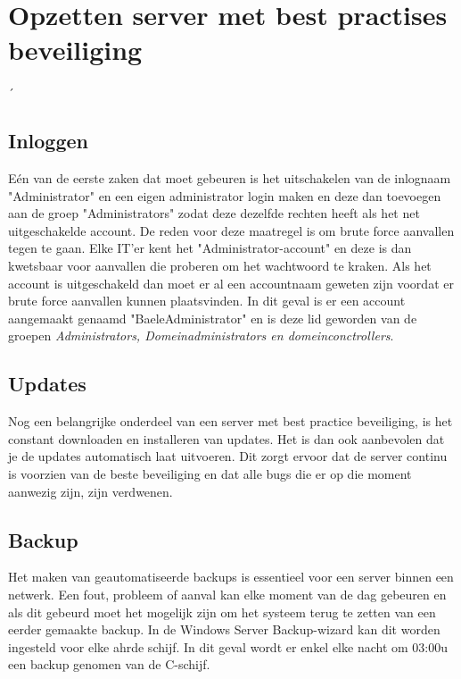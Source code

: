 \documentclass[pdftex,a4paper,12pt]{report}
\begin{document}
\subsection{}
\chapter{Opzetten server met best practises beveiliging}
´%

\section{Inloggen}
Eén van de eerste zaken dat moet gebeuren is het uitschakelen van de inlognaam "Administrator" en een eigen administrator login maken en deze dan toevoegen aan de groep "Administrators" zodat deze dezelfde rechten heeft als het net uitgeschakelde account. De reden voor deze maatregel is om brute force aanvallen tegen te gaan. Elke IT'er kent het "Administrator-account" en deze is dan kwetsbaar voor aanvallen die proberen om het wachtwoord te kraken. Als het account is uitgeschakeld dan moet er al een accountnaam geweten zijn voordat er brute force aanvallen kunnen plaatsvinden. In dit geval is er een account aangemaakt genaamd "BaeleAdministrator" en is deze lid geworden van de groepen \textit{Administrators, Domeinadministrators en domeinconctrollers}.

\section{Updates}
Nog een belangrijke onderdeel van een server met best practice beveiliging, is het constant downloaden en installeren van updates. Het is dan ook aanbevolen dat je de updates automatisch laat uitvoeren. Dit zorgt ervoor dat de server continu is voorzien van de beste beveiliging en dat alle bugs die er op die moment aanwezig zijn, zijn verdwenen. 

\section{Backup}
Het maken van geautomatiseerde backups is essentieel voor een server binnen een netwerk. Een fout, probleem of aanval kan elke moment van de dag gebeuren en als dit gebeurd moet het mogelijk zijn om het systeem terug te zetten van een eerder gemaakte backup. In de Windows Server Backup-wizard kan dit worden ingesteld voor elke ahrde schijf. In dit geval wordt er enkel elke nacht om 03:00u een backup genomen van de C-schijf. 
\end{document}
